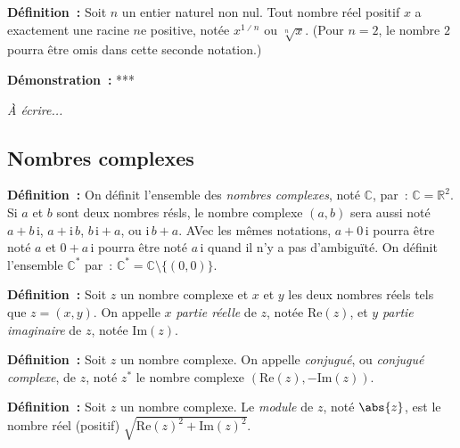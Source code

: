 \medskip

\noindent\textbf{Définition :} Soit $n$ un entier naturel non nul. 
    Tout nombre réel positif $x$ a exactement une racine $n$e positive, notée $x^{1 \divslash n}$ ou $\sqrt[n]{x}$.
    (Pour $n = 2$, le nombre $2$ pourra être omis dans cette seconde notation.)

\medskip

\noindent\textbf{Démonstration :} ***

\medskip

\emph{À écrire...}

\subsection{Nombres complexes}

\noindent\textbf{Définition :} 
    On définit l'ensemble des \emph{nombres complexes}, noté $\mathbb{C}$, par : $\mathbb{C} = \mathbb{R}^2$.
    Si $a$ et $b$ sont deux nombres résls, le nombre complexe $(a, b)$ sera aussi noté $a + b \, \mathrm{i}$, $a + \mathrm{i} \, b$, $b \, \mathrm{i} + a$, ou $\mathrm{i} \, b + a$.
    AVec les mêmes notations, $a + 0 \, \mathrm{i}$ pourra être noté $a$ et $0 + a \, \mathrm{i}$ pourra être noté $a \, \mathrm{i}$ quand il n'y a pas d'ambiguïté.
    On définit l'ensemble $\mathbb{C}^*$ par : $\mathbb{C}^* = \mathbb{C} \setminus \lbrace (0, 0) \rbrace$.

\medskip

\noindent\textbf{Définition :}   
    Soit $z$ un nombre complexe et $x$ et $y$ les deux nombres réels tels que $z = (x, y)$.
    On appelle $x$ \emph{partie réelle} de $z$, notée $\mathrm{Re}(z)$, et $y$ \emph{partie imaginaire} de $z$, notée $\mathrm{Im}(z)$.

\medskip

\noindent\textbf{Définition :}  \sindex[isy]{$*$}
    Soit $z$ un nombre complexe.
    On appelle \emph{conjugué}, ou \emph{conjugué complexe}, de $z$, noté $z^*$ le nombre complexe $\left( \mathrm{Re}(z), - \mathrm{Im}(z) \right)$.

\medskip

\noindent\textbf{Définition :}  \sindex[isy]{$\abs{\cdot}$}
    Soit $z$ un nombre complexe. 
    Le \emph{module} de $z$, noté $\abs{z}$, est le nombre réel (positif) $\sqrt{\mathrm{Re}(z)^2 + \mathrm{Im}(z)^2}$.

